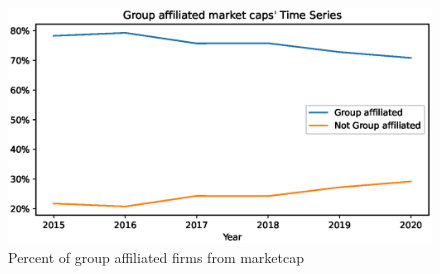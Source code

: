 \documentclass[12pt, a4paper]{article}
\begin{document}
\begin{figure}
	\centering  
	\caption{Percent of group affiliated firms from marketcap}
	\includegraphics[width=\linewidth]{"BGMarketCaptimeSeries.eps"}
	
\end{figure}
 
%
\end{document}
